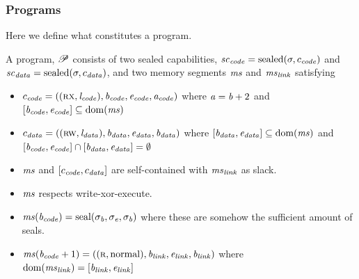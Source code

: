 \documentclass[a4paper]{article}
\begin{document}
\subsubsection{Programs}
Here we define what constitutes a program.
\begin{definition}
  \label{def:program}
  A program, $\program$ consists of two sealed capabilities, $\vsc_\code = \sealed{\sigma,c_\code}$ and $\vsc_\data = \sealed{\sigma,c_\data}$, and two memory segments $\ms$ and $\ms_\link$ satisfying
  \begin{itemize}
  \item $c_\code = ((\rx,\lin_\code),\baddr_\code,\eaddr_\code,\aaddr_\code)$ where $\aaddr = \baddr + 2$ and $[\baddr_\code,\eaddr_\code]\subseteq \dom(\ms)$
  \item $c_\data = ((\rw,\lin_\data),\baddr_\data,\eaddr_\data,\baddr_\data)$ where $[\baddr_\data,\eaddr_\data] \subseteq \dom(\ms)$ and $[\baddr_\code,\eaddr_\code] \cap [\baddr_\data,\eaddr_\data] = \emptyset$
  \item $\ms$ and $[c_\code,c_\data]$ are self-contained with $\ms_\link$ as slack.
  \item $\ms$ respects write-xor-execute.
  \item $\ms(\baddr_\code) = \seal{\sigma_\baddr,\sigma_\eaddr,\sigma_\baddr}$ where these are somehow the sufficient amount of seals.
  \item $\ms(\baddr_\code+1) = ((\ro,\normal),\baddr_\link, \eaddr_\link, \baddr_\link)$ where $\dom(\ms_\link) = [\baddr_\link, \eaddr_\link]$
  \end{itemize}
\end{definition}
\end{document}
